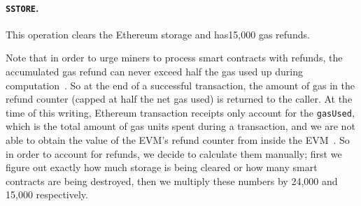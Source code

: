 \paragraph{\texttt{SSTORE}.} This operation clears the Ethereum storage and has15,000 gas refunds. 


Note that in order to urge miners to process smart contracts with refunds, the accumulated gas refund can never exceed half the gas used up during computation~\cite{wood2014ethereum}. So at the end of a successful transaction, the amount of gas in the refund counter (capped at half the net gas used) is returned to the caller. At the time of this writing, Ethereum transaction receipts only account for the \texttt{gasUsed}, which is the total amount of gas units spent during a transaction, and we are not able to obtain the value of the EVM's refund counter from inside the EVM~\cite{signer2018gas}. So in order to account for refunds, we decide to calculate them manually; first we figure out exactly how much storage is being cleared or how many smart contracts are being destroyed, then we multiply these numbers by 24,000 and 15,000 respectively. 




%


% 

